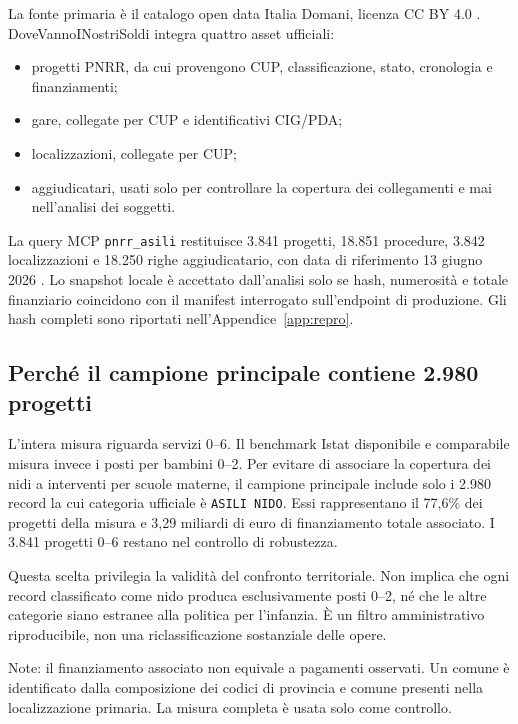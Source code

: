 \documentclass[10pt,a4paper]{article}
\begin{document}
La fonte primaria è il catalogo open data Italia Domani, licenza CC BY 4.0 \citep{italiadomani2026}. DoveVannoINostriSoldi integra quattro asset ufficiali:

\begin{itemize}
  \item progetti PNRR, da cui provengono CUP, classificazione, stato, cronologia e finanziamenti;
  \item gare, collegate per CUP e identificativi CIG/PDA;
  \item localizzazioni, collegate per CUP;
  \item aggiudicatari, usati solo per controllare la copertura dei collegamenti e mai nell'analisi dei soggetti.
\end{itemize}

La query MCP \texttt{pnrr\_asili} restituisce 3.841 progetti, 18.851 procedure, 3.842 localizzazioni e 18.250 righe aggiudicatario, con data di riferimento 13 giugno 2026 \citep{dvns2026}. Lo snapshot locale è accettato dall'analisi solo se hash, numerosità e totale finanziario coincidono con il manifest interrogato sull'endpoint di produzione. Gli hash completi sono riportati nell'Appendice~\ref{app:repro}.

\subsection{Perché il campione principale contiene 2.980 progetti}

L'intera misura riguarda servizi 0--6. Il benchmark Istat disponibile e comparabile misura invece i posti per bambini 0--2. Per evitare di associare la copertura dei nidi a interventi per scuole materne, il campione principale include solo i 2.980 record la cui categoria ufficiale è \texttt{ASILI NIDO}. Essi rappresentano il 77,6\% dei progetti della misura e 3,29 miliardi di euro di finanziamento totale associato. I 3.841 progetti 0--6 restano nel controllo di robustezza.

Questa scelta privilegia la validità del confronto territoriale. Non implica che ogni record classificato come nido produca esclusivamente posti 0--2, né che le altre categorie siano estranee alla politica per l'infanzia. È un filtro amministrativo riproducibile, non una riclassificazione sostanziale delle opere.

\begin{table}[H]
\centering
\caption{Campione e grandezze principali}
\label{tab:summary}
\resizebox{\textwidth}{!}{}
\begin{minipage}{0.96\textwidth}\footnotesize\color{dvnsgrey}
Note: il finanziamento associato non equivale a pagamenti osservati. Un comune è identificato dalla composizione dei codici di provincia e comune presenti nella localizzazione primaria. La misura completa è usata solo come controllo.
\end{minipage}
\end{table}
\end{document}
